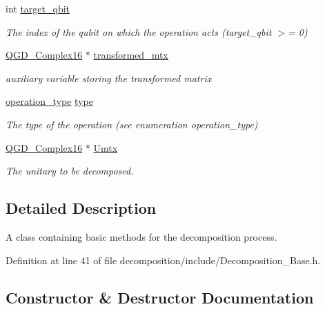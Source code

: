 \begin{DoxyCompactItemize}
int \hyperlink{class_operation_a3e489b72c124b494777c71b1646bb1e9}{target\+\_\+qbit}
\begin{DoxyCompactList}\small\item\em The index of the qubit on which the operation acts (target\+\_\+qbit $>$= 0) \end{DoxyCompactList}\item 
\hyperlink{struct_q_g_d___complex16}{Q\+G\+D\+\_\+\+Complex16} $\ast$ \hyperlink{class_decomposition___base_ae6fa4013266ee6e702b7e645c6bbfed1}{transformed\+\_\+mtx}
\begin{DoxyCompactList}\small\item\em auxiliary variable storing the transformed matrix \end{DoxyCompactList}\item 
\hyperlink{operations_2include_2_operation_8h_ad99e62941c8e4b13e5fc45ecaaf65eff}{operation\+\_\+type} \hyperlink{class_operation_ad47c56c86d62a4c775571e1600416479}{type}
\begin{DoxyCompactList}\small\item\em The type of the operation (see enumeration operation\+\_\+type) \end{DoxyCompactList}\item 
\hyperlink{struct_q_g_d___complex16}{Q\+G\+D\+\_\+\+Complex16} $\ast$ \hyperlink{class_decomposition___base_a61a784aaba39276260b3f73709b51ccc}{Umtx}
\begin{DoxyCompactList}\small\item\em The unitary to be decomposed. \end{DoxyCompactList}\end{DoxyCompactItemize}


\subsection{Detailed Description}
A class containing basic methods for the decomposition process. 

Definition at line 41 of file decomposition/include/\+Decomposition\+\_\+\+Base.\+h.



\subsection{Constructor \& Destructor Documentation}
